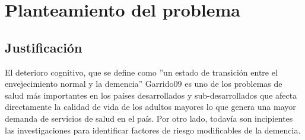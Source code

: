 \chapter{Planteamiento del problema}




%
%



\section{Justificaci\'on}

El deterioro cognitivo, que se define como ''un estado de transici\'on entre el envejecimiento 
normal y la demencia'' {Garrido09} es uno de los problemas de salud m\'as importantes en los 
pa\'ises desarrollados y sub-desarrollados que afecta directamente la calidad de vida de los 
adultos mayores lo que genera una mayor demanda de servicios de salud en el pa\'is.
Por otro lado, todav\'ia son incipientes las investigaciones para identificar 
factores de riesgo modificables de la demencia.
\cite{PlanAlzheimer04}

